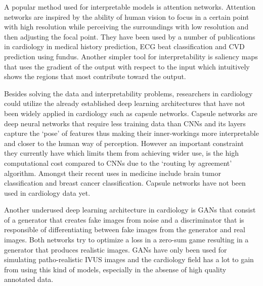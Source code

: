 \documentclass[journal]{IEEEtran}
\begin{document}
A popular method used for interpretable models is attention networks\cite{bahdanau2014neural}.
Attention networks are inspired by the ability of human vision to focus in a certain point with high resolution while perceiving the surroundings with low resolution and then adjusting the focal point.
They have been used by a number of publications in cardiology in medical history prediction\cite{kim2017highrisk}, ECG beat classification\cite{schwab2017beat} and CVD prediction using fundus\cite{poplin2017predicting}.
Another simpler tool for interpretability is saliency maps\cite{simonyan2013deep} that uses the gradient of the output with respect to the input which intuitively shows the regions that most contribute toward the output.

Besides solving the data and interpretability problems, researchers in cardiology could utilize the already established deep learning architectures that have not been widely applied in cardiology such as capsule networks.
Capsule networks\cite{sabour2017dynamic} are deep neural networks that require less training data than CNNs and its layers capture the `pose' of features thus making their inner-workings more interpretable and closer to the human way of perception.
However an important constraint they currently have which limits them from achieving wider use, is the high computational cost compared to CNNs due to the `routing by agreement' algorithm.
Amongst their recent uses in medicine include brain tumor classification\cite{afshar2018brain} and breast cancer classification\cite{iesmantas2018convolutional}.
Capsule networks have not been used in cardiology data yet.

Another underused deep learning architecture in cardiology is GANs\cite{goodfellow2014generative} that consist of a generator that creates fake images from noise and a discriminator that is responsible of differentiating between fake images from the generator and real images.
Both networks try to optimize a loss in a zero-sum game resulting in a generator that produces realistic images.
GANs have only been used for simulating patho-realistic IVUS images\cite{tom2018simulating} and the cardiology field has a lot to gain from using this kind of models, especially in the absense of high quality annotated data.
\end{document}
